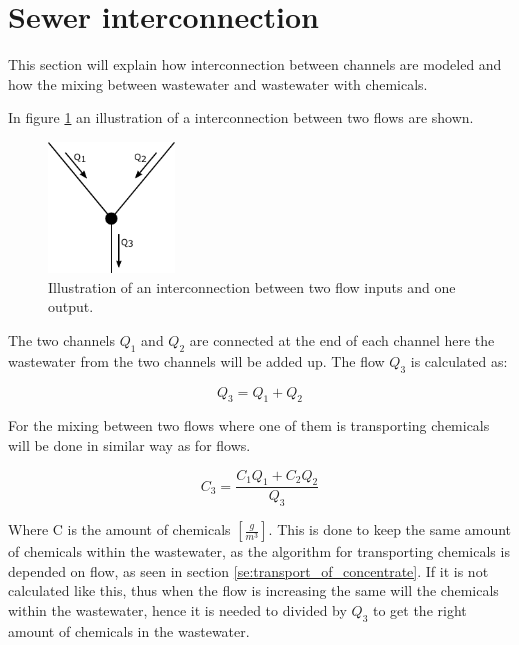 \section{Sewer interconnection}\label{se:sewer_interconnection}
This section will explain how interconnection between channels are modeled and how the mixing between wastewater and wastewater with chemicals.

In figure \ref{fig:interconnections} an illustration of a interconnection between two flows are shown.

\begin{figure}[H]
\centering
\includegraphics[width=0.30\textwidth]{report/modeling/pictures/interconnections}
\caption{Illustration of an interconnection between two flow inputs and one output.}
\label{fig:interconnections}
\end{figure} 

The two channels $Q_1$ and $Q_2$ are connected at the end of each channel here the wastewater from the two channels will be added up. The flow $Q_3$ is calculated as:

\begin{equation}
	Q_3 = Q_1 + Q_2 	
\end{equation} 

For the mixing between two flows where one of them is transporting chemicals will be done in similar way as for flows. 

\begin{equation}\label{poop_addition_interconnection}
	C_3 = \frac{C_1 Q_1 + C_2 Q_2}{Q_3}
\end{equation}

Where C is the amount of chemicals $[\frac{g}{m^3}]$. This is done to keep the same amount of chemicals within the wastewater, as the algorithm for transporting chemicals is depended on flow, as seen in section \ref{se:transport_of_concentrate}. If it is not calculated like this, thus when the flow is increasing the same will the chemicals within the wastewater, hence it is needed to divided by $Q_3$ to get the right amount of chemicals in the wastewater.  